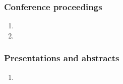 \subsubsection{Conference proceedings}
\begin{enumerate}
	\item 
	\item 
\end{enumerate}


\subsubsection{Presentations and abstracts}
\begin{enumerate}
	\item
\end{enumerate}

\endinput